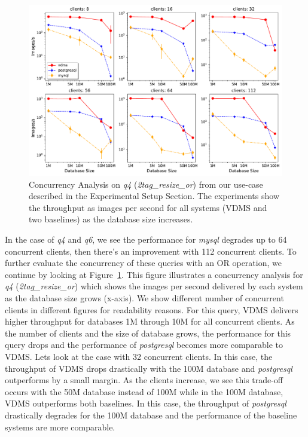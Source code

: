 \begin{figure}[ht]
\includegraphics[width=\columnwidth]{figures/plot_q_2tag_resize_or_mosaic_results_throughput_threads}
\caption{Concurrency Analysis on \textit{q4} (\textit{2tag\_resize\_or}) from our use-case
described in the Experimental Setup Section.
The experiments show the throughput as images per second for
all systems (VDMS and two baselines) as the database size increases.}
\label{fig:concurrency_comparison_q4}
\end{figure}

In the case of \textit{q4} and \textit{q6}, we see the performance for \textit{mysql}
degrades up to 64 concurrent clients, then there's an improvement with 112 concurrent clients.
To further evaluate the concurrency of these queries with an OR operation, we continue by
looking at Figure~\ref{fig:concurrency_comparison_q4}. This figure illustrates a concurrency analysis for
\textit{q4} (\textit{2tag\_resize\_or}) which shows the images per second
delivered by each system as the database size grows (x-axis). We show different number
of concurrent clients in different figures for readability reasons.  For this query,
VDMS delivers higher throughput for databases 1M through 10M for all concurrent clients.
As the number of clients and the size of database grows, the performance for this query
drops and the performance of \textit{postgresql} becomes more comparable to VDMS. Lets look at the
case with 32 concurrent clients.
In this case, the throughput of VDMS drops drastically with
the 100M database and \textit{postgresql} outperforms by a small margin.
As the clients increase, we see this trade-off occurs with the 50M database
instead of 100M while in the 100M database, VDMS outperforms both baselines.
In this case, the throughput of \textit{postgresql} drastically degrades
for the 100M database and the performance of the baseline systems are more comparable.

